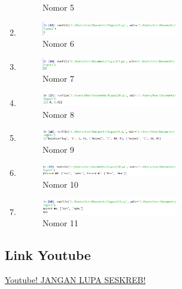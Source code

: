 \begin{enumerate}
\begin{figure}[H]
		\centering
		\caption{Nomor 5}
    \end{figure}
    \item 
    
    \begin{figure}[H]
		\includegraphics[width=6cm]{figures/1174050/Tugas3/6.png}
		\centering
		\caption{Nomor 6}
    \end{figure}
    \item 
    
    \begin{figure}[H]
		\includegraphics[width=6cm]{figures/1174050/Tugas3/7.png}
		\centering
		\caption{Nomor 7}
    \end{figure}
    \item 
    
    \begin{figure}[H]
		\includegraphics[width=6cm]{figures/1174050/Tugas3/8.png}
		\centering
		\caption{Nomor 8}
    \end{figure}
    \item 
    
    \begin{figure}[H]
		\includegraphics[width=6cm]{figures/1174050/Tugas3/9.png}
		\centering
		\caption{Nomor 9}
    \end{figure}
    \item 
    
    \begin{figure}[H]
		\includegraphics[width=6cm]{figures/1174050/Tugas3/10.png}
		\centering
		\caption{Nomor 10}
    \end{figure}
    \item 
    
    \begin{figure}[H]
		\includegraphics[width=6cm]{figures/1174050/Tugas3/11.png}
		\centering
		\caption{Nomor 11}
	\end{figure}
\end{enumerate}
\subsection{Link Youtube}
\href{https://youtu.be/-_xwZFC9QGE}{Youtube! JANGAN LUPA SESKREB!}